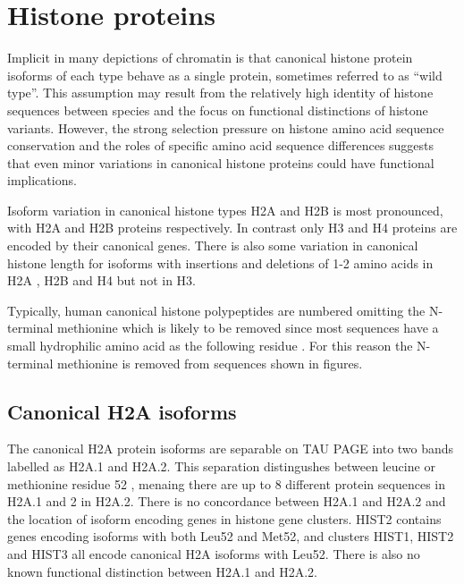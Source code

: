 \section{Histone proteins}

	Implicit in many depictions of chromatin is that 
	canonical histone protein isoforms of each type behave as a single protein, 
	sometimes referred to as ``wild type''. 
	This assumption may result from the relatively high identity of histone sequences between species 
	and the focus on functional distinctions of histone variants. 
	However, the strong selection pressure on histone amino acid sequence conservation 
	and the roles of specific amino acid sequence differences  
	suggests that even minor variations in canonical histone proteins could have functional implications.
	
	Isoform variation in canonical histone types H2A and H2B is most pronounced, 
	with \HTwoAUniqueProteins{} H2A and \HTwoBUniqueProteins{} H2B proteins respectively. 
	In contrast only \HThreeUniqueProteins{} H3 and \HFourUniqueProteins{} H4 proteins 
	are encoded by their canonical genes. 
	There is also some variation in canonical histone length for isoforms 
	with insertions and deletions of 1-2 amino acids 
	in H2A , H2B  and H4  but not in H3.

	Typically, human canonical histone polypeptides are numbered omitting the N-terminal methionine 
	which is likely to be removed since most sequences have a small hydrophilic amino acid as the following residue . 
	For this reason the N-terminal methionine is removed from sequences shown in figures.

  \subsection{Canonical H2A isoforms}
	
	The canonical H2A protein isoforms are separable on TAU PAGE into two bands labelled as H2A.1 and H2A.2. 
	This separation distingushes between leucine or methionine residue 52 , 
	menaing there are up to 8 different protein sequences in H2A.1 and 2 in H2A.2. 
	There is no concordance between H2A.1 and H2A.2 
	and the location of isoform encoding genes in histone gene clusters. 
	HIST2 contains genes encoding isoforms with both Leu52 and Met52, 
	and clusters HIST1, HIST2 and HIST3 all encode canonical H2A isoforms with Leu52. 
	There is also no known functional distinction between H2A.1 and H2A.2.

